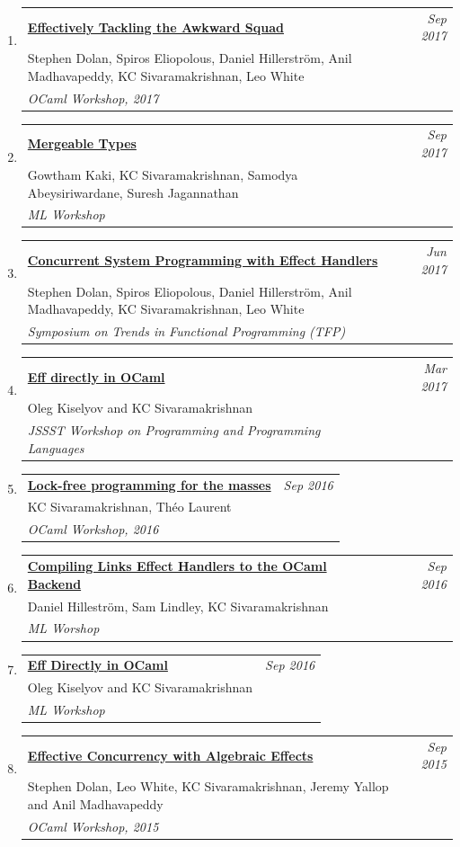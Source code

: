 \documentclass[10pt]{article}
\makeatletter
\newcommand{\lbar}[1]{{\color{#1}\ding{118}}\hspace*{2pt}}
\newenvironment{benumerate}[2]{
    \let\oldItem\item
    \def\item{\addtocounter{enumi}{-2}\oldItem}
    \begin{enumerate}[#2] \itemsep3pt
    \setcounter{enumi}{#1}
    \addtocounter{enumi}{1}}
  {\end{enumerate}}
\newenvironment{publication}[5]
{ \item
  \begin{tabular*}{7.5in}{p{6.3in}@{\extracolsep{\fill}}r}
    \href{#1}{\textbf{#2}} & \textit{#3}\\ #4 &\\ \textit{#5}&\\
  \end{tabular*}
} {}
\newenvironment{region}[3]{%
  \Needspace{7\baselineskip}
  \vspace*{0.5ex}
  {\scalebox{1.4}{\textbf{#1}}}
  \begin{benumerate}{#3}{\color{RoyalBlue}#2}}
  {\end{benumerate}\vspace{0.8ex}}
\makeatother
\begin{document}
\begin{region} {\lbar{purple}Workshop Publications}{{W}1}{26}
  \begin{publication}{http://kcsrk.info/papers/awkward_effects_ml17.pdf}
    {Effectively Tackling the Awkward Squad}
    {Sep 2017}{Stephen Dolan, Spiros Eliopolous, Daniel Hillerström, Anil Madhavapeddy, KC Sivaramakrishnan, Leo White}
    {OCaml Workshop, 2017}
  \end{publication}

  \begin{publication}{http://kcsrk.info/papers/mergeable_types_ml17.pdf}
    {Mergeable Types}
    {Sep 2017}{Gowtham Kaki, KC Sivaramakrishnan, Samodya Abeysiriwardane, Suresh Jagannathan}
    {ML Workshop}
  \end{publication}

  \begin{publication}{http://kcsrk.info/papers/system_effects_feb_18.pdf}
    {Concurrent System Programming with Effect Handlers}
    {Jun 2017}{Stephen Dolan, Spiros Eliopolous, Daniel Hillerström, Anil Madhavapeddy, KC Sivaramakrishnan, Leo White}
    {Symposium on Trends in Functional Programming (TFP)}
  \end{publication}

  \begin{publication}{http://kcsrk.info/papers/eff_ocaml_ppl17.pdf}
    {Eff directly in OCaml}
    {Mar 2017}{Oleg Kiselyov and KC Sivaramakrishnan}
    {JSSST Workshop on Programming and Programming Languages}
  \end{publication}

  \begin{publication}{http://kcsrk.info/papers/reagents_ocaml16.pdf}
    {Lock-free programming for the masses}
    {Sep 2016}{KC Sivaramakrishnan, Théo Laurent}
    {OCaml Workshop, 2016}
  \end{publication}

  \begin{publication}{http://kcsrk.info/papers/links_ocaml_ml16.pdf}
    {Compiling Links Effect Handlers to the OCaml Backend}
    {Sep 2016}{Daniel Hilleström, Sam Lindley, KC Sivaramakrishnan}
    {ML Worshop}
  \end{publication}

  \begin{publication}{http://kcsrk.info/papers/eff_ocaml_ml16.pdf}
    {Eff Directly in OCaml}
    {Sep 2016}{Oleg Kiselyov and KC Sivaramakrishnan}
    {ML Workshop}
  \end{publication}

  \begin{publication}{http://kcsrk.info/papers/effects_ocaml15.pdf}
    {Effective Concurrency with Algebraic Effects}
    {Sep 2015}{Stephen Dolan, Leo White, KC Sivaramakrishnan, Jeremy Yallop and Anil Madhavapeddy}
    {OCaml Workshop, 2015}
  \end{publication}


\end{region}
\end{document}
